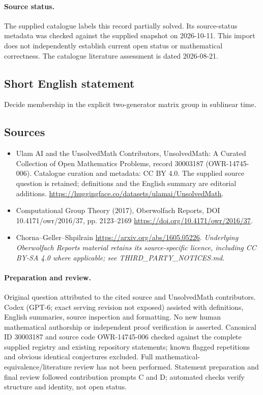 \documentclass[11pt]{article}
\begin{document}
\paragraph{Source status.}
The supplied catalogue labels this record partially solved. Its source-status metadata was checked against the supplied snapshot on 2026-10-11. This import does not independently establish current open status or mathematical correctness. The catalogue literature assessment is dated 2026-08-21.
\subsection{Short English statement}
Decide membership in the explicit two-generator matrix group in sublinear time.
\subsection{Sources}
\begin{itemize}
\item[\hypertarget{source:30003187:1}{S1}] Ulam AI and the UnsolvedMath Contributors, UnsolvedMath: A Curated Collection of Open Mathematics Problems, record 30003187 (OWR-14745-006). Catalogue curation and metadata: CC BY 4.0. The supplied source question is retained; definitions and the English summary are editorial additions.
\url{https://huggingface.co/datasets/ulamai/UnsolvedMath}.
\item[\hypertarget{source:30003187:2}{S2}] Computational Group Theory (2017), Oberwolfach Reports, DOI 10.4171/owr/2016/37, pp. 2123--2169
\url{https://doi.org/10.4171/owr/2016/37}.
\item[\hypertarget{source:30003187:3}{S3}] Chorna--Geller--Shpilrain
\url{https://arxiv.org/abs/1605.05226}.
\textit{Underlying Oberwolfach Reports material retains its source-specific licence, including CC BY-SA 4.0 where applicable; see THIRD\_PARTY\_NOTICES.md.}
\end{itemize}
\paragraph{Preparation and review.}
Original question attributed to the cited source and UnsolvedMath contributors. Codex (GPT-6; exact serving revision not exposed) assisted with definitions, English summaries, source inspection and formatting. No new human mathematical authorship or independent proof verification is asserted. Canonical ID 30003187 and source code OWR-14745-006 checked against the complete supplied registry and existing repository statements; known flagged repetitions and obvious identical conjectures excluded. Full mathematical-equivalence/literature review has not been performed. Statement preparation and final review followed contribution prompts C and D; automated checks verify structure and identity, not open status.
\label{end:30003187}
\end{document}
